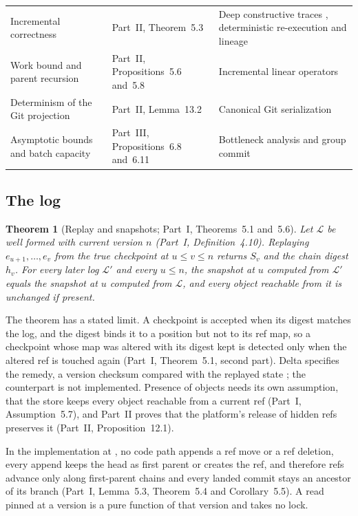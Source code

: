 \documentclass[11pt,letterpaper]{article}
\newtheorem{theorem}{Theorem}[section]
\theoremstyle{definition}
\theoremstyle{remark}
\newcommand{\Snap}[1]{S_{#1}}
\newcommand{\Log}{\mathcal{L}}
\begin{document}
\begin{table}[t]
\begin{tabularx}{\textwidth}{@{}L{4.3cm}L{3.3cm}Y@{}}
Incremental correctness & Part~II, Theorem~5.3 & Deep constructive traces \cite{mokhov2018build}, deterministic re-execution \cite{dean2004mapreduce} and lineage \cite{zaharia2012rdd} \\
Work bound and parent recursion & Part~II, Propositions~5.6 and~5.8 & Incremental linear operators \cite{budiu2023dbsp} \\
Determinism of the Git projection & Part~II, Lemma~13.2 & Canonical Git serialization \cite{gitobjects} \\
Asymptotic bounds and batch capacity & Part~III, Propositions~6.8 and~6.11 & Bottleneck analysis \cite{denning1978operational} and group commit \cite{dewitt1984main} \\
\bottomrule
\end{tabularx}
\end{table}

\subsection{The log}

\begin{theorem}[Replay and snapshots; Part~I, Theorems~5.1 and~5.6]
\label{thm:syn:log}
Let $\Log$ be well formed with current version $n$ (Part~I, Definition~4.10). Replaying $e_{u+1},\dots,e_v$ from the true checkpoint at $u\le v\le n$ returns $\Snap{v}$ and the chain digest $h_v$. For every later log $\Log'$ and every $u\le n$, the snapshot at $u$ computed from $\Log'$ equals the snapshot at $u$ computed from $\Log$, and every object reachable from it is unchanged if present.
\end{theorem}

The theorem has a stated limit. A checkpoint is accepted when its digest matches the log, and the digest binds it to a position but not to its ref map, so a checkpoint whose map was altered with its digest kept is detected only when the altered ref is touched again (Part~I, Theorem~5.1, second part). Delta specifies the remedy, a version checksum compared with the replayed state \cite{deltaprotocol}; the counterpart is not implemented. Presence of objects needs its own assumption, that the store keeps every object reachable from a current ref (Part~I, Assumption~5.7), and Part~II proves that the platform's release of hidden refs preserves it (Part~II, Proposition~12.1).

In the implementation at , no code path appends a ref move or a ref deletion, every append keeps the head as first parent or creates the ref, and therefore refs advance only along first-parent chains and every landed commit stays an ancestor of its branch (Part~I, Lemma~5.3, Theorem~5.4 and Corollary~5.5). A read pinned at a version is a pure function of that version and takes no lock.
\end{document}
